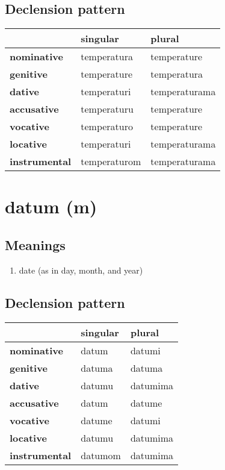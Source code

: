 \subsection*{Declension pattern}
\begin{tabularx}{\linewidth}{Xll}
\toprule
{} &      singular &         plural \\
\midrule
\textbf{nominative  } &   temperatura &    temperature \\
\textbf{genitive    } &   temperature &    temperatura \\
\textbf{dative      } &   temperaturi &  temperaturama \\
\textbf{accusative  } &   temperaturu &    temperature \\
\textbf{vocative    } &   temperaturo &    temperature \\
\textbf{locative    } &   temperaturi &  temperaturama \\
\textbf{instrumental} &  temperaturom &  temperaturama \\
\bottomrule
\end{tabularx}

\filbreak
\section{datum (m)}
\subsection*{Meanings}
\begin{enumerate}
\item date (as in day, month, and year)
\end{enumerate}
\subsection*{Declension pattern}
\begin{tabularx}{\linewidth}{Xll}
\toprule
{} & singular &    plural \\
\midrule
\textbf{nominative  } &    datum &    datumi \\
\textbf{genitive    } &   datuma &    datuma \\
\textbf{dative      } &   datumu &  datumima \\
\textbf{accusative  } &    datum &    datume \\
\textbf{vocative    } &   datume &    datumi \\
\textbf{locative    } &   datumu &  datumima \\
\textbf{instrumental} &  datumom &  datumima \\
\bottomrule
\end{tabularx}

